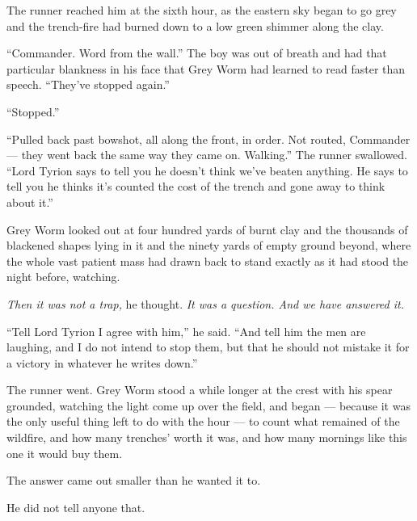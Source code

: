 \sceneBreak

The runner reached him at the sixth hour, as the eastern sky began to go grey and the trench-fire had burned down to a low green shimmer along the clay.

“Commander. Word from the wall.” The boy was out of breath and had that particular blankness in his face that Grey Worm had learned to read faster than speech. “They’ve stopped again.”

“Stopped.”

“Pulled back past bowshot, all along the front, in order. Not routed, Commander — they went back the same way they came on. Walking.” The runner swallowed. “Lord Tyrion says to tell you he doesn’t think we’ve beaten anything. He says to tell you he thinks it’s counted the cost of the trench and gone away to think about it.”

Grey Worm looked out at four hundred yards of burnt clay and the thousands of blackened shapes lying in it and the ninety yards of empty ground beyond, where the whole vast patient mass had drawn back to stand exactly as it had stood the night before, watching.

\textit{Then it was not a trap,} he thought. \textit{It was a question. And we have answered it.}

“Tell Lord Tyrion I agree with him,” he said. “And tell him the men are laughing, and I do not intend to stop them, but that he should not mistake it for a victory in whatever he writes down.”

The runner went. Grey Worm stood a while longer at the crest with his spear grounded, watching the light come up over the field, and began — because it was the only useful thing left to do with the hour — to count what remained of the wildfire, and how many trenches’ worth it was, and how many mornings like this one it would buy them.

The answer came out smaller than he wanted it to.

He did not tell anyone that.